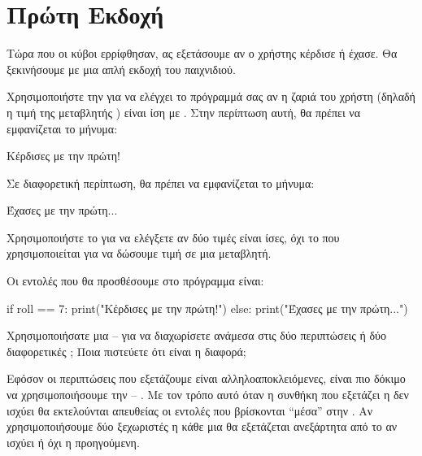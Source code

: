 \documentclass[a4paper,11pt,oneside]{book}
\begin{document}
\section{Πρώτη Εκδοχή}

Τώρα που οι κύβοι ερρίφθησαν, ας εξετάσουμε αν ο χρήστης κέρδισε ή έχασε. Θα ξεκινήσουμε με μια απλή εκδοχή του παιχνιδιού.

\begin{step}
Χρησιμοποιήστε την  για να ελέγχει το πρόγραμμά σας αν η ζαριά του χρήστη (δηλαδή η τιμή της μεταβλητής ) είναι ίση με .
Στην περίπτωση αυτή, θα πρέπει να εμφανίζεται το μήνυμα:

\marginnote[16pt]{\iconcomputer}
\begin{pyterm}
Κέρδισες με την πρώτη!
\end{pyterm}

Σε διαφορετική περίπτωση, θα πρέπει να εμφανίζεται το μήνυμα:

\begin{pyterm}
Έχασες με την πρώτη...
\end{pyterm}

\clearpage
\marginnote[24pt]{\iconcaution}
Χρησιμοποιήστε το \pyinline{==} για να ελέγξετε αν δύο τιμές είναι ίσες, όχι το \pyinline{=} που χρησιμοποιείται για να δώσουμε τιμή σε μια μεταβλητή.

\begin{answer}
Οι εντολές που θα προσθέσουμε στο πρόγραμμα είναι:

\begin{pynew}
if roll == 7:
    print("Κέρδισες με την πρώτη!")
else:
    print("Έχασες με την πρώτη...")
\end{pynew}
\end{answer}

Χρησιμοποιήσατε μια -- για να διαχωρίσετε ανάμεσα στις δύο περιπτώσεις ή δύο διαφορετικές ; Ποια πιστεύετε ότι είναι η διαφορά;

\begin{answer}
Εφόσον οι περιπτώσεις που εξετάζουμε είναι αλληλοαποκλειόμενες, είναι πιο δόκιμο να χρησιμοποιήσουμε την  -- . Με τον τρόπο αυτό όταν η συνθήκη που εξετάζει η  δεν ισχύει θα εκτελούνται απευθείας οι εντολές που βρίσκονται ``μέσα'' στην . Αν χρησιμοποιήσουμε δύο ξεχωριστές  η κάθε μια θα εξετάζεται ανεξάρτητα από το αν ισχύει ή όχι η προηγούμενη.
\end{answer}


\end{step}
\end{document}
